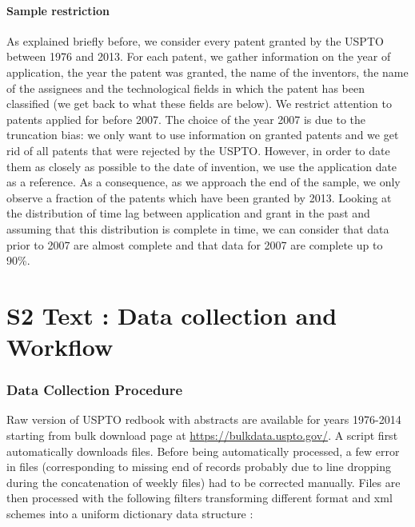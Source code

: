 \documentclass[12pt,twoside,a4paper]{article}
\begin{document}
\paragraph{Sample restriction}
As explained briefly before, we consider every patent granted by the USPTO between 1976 and 2013. For each patent, we gather information on the year of application, the year the patent was granted, the name of the inventors, the name of the assignees and the technological fields in which the patent has been classified (we get back to what these fields are below). We restrict attention to patents applied for before 2007. The choice of the year 2007 is due to the truncation bias: we only want to use information on granted patents and we get rid of all patents that were rejected by the USPTO. However, in order to date them as closely as possible to the date of invention, we use the application date as a reference. As a consequence, as we approach the end of the sample, we only observe a fraction of the patents which have been granted by 2013. Looking at the distribution of time lag between application and grant in the past and assuming that this distribution is complete in time, we can consider that data prior to 2007 are almost complete and that data for 2007 are complete up to 90\%.







\newpage







\section*{S2 Text : Data collection and Workflow}

\label{supp:data}

\subsubsection*{Data Collection Procedure}

Raw version of USPTO redbook with abstracts are available for years 1976-2014 starting from bulk download page at \url{https://bulkdata.uspto.gov/}. A script first automatically downloads files. Before being automatically processed, a few error in files (corresponding to missing end of records probably due to line dropping during the concatenation of weekly files) had to be corrected manually. Files are then processed with the following filters transforming different format and xml schemes into a uniform dictionary data structure :
\end{document}

